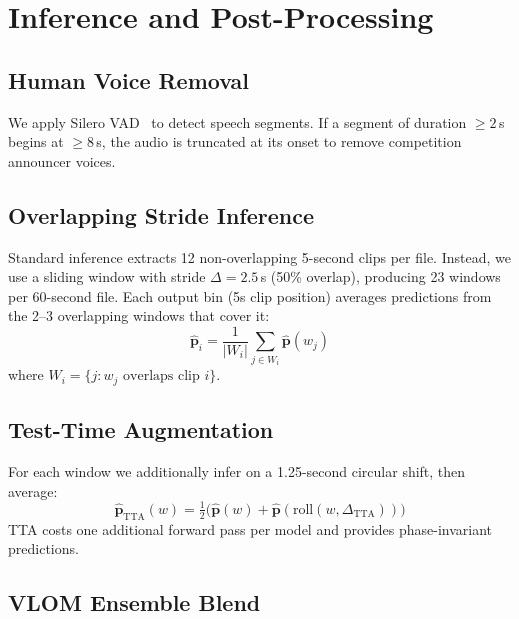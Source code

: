 \documentclass[10pt,twocolumn]{article}
\begin{document}
\section{Inference and Post-Processing}
\label{sec:inference}

\subsection{Human Voice Removal}
\label{sec:vad}

We apply Silero VAD~\cite{silero2021} to detect speech segments.
If a segment of duration $\geq 2$\,s begins at $\geq 8$\,s, the audio
is truncated at its onset to remove competition announcer voices.

\subsection{Overlapping Stride Inference}
\label{sec:stride}

Standard inference extracts 12 non-overlapping 5-second clips per file.
Instead, we use a sliding window with stride $\Delta = 2.5$\,s (50\% overlap),
producing 23 windows per 60-second file.
Each output bin (5s clip position) averages predictions from the 2--3
overlapping windows that cover it:
\begin{equation}
  \hat{\bm{p}}_i = \frac{1}{|W_i|}\sum_{j \in W_i} \hat{\bm{p}}(w_j)
  \label{eq:stride}
\end{equation}
where $W_i = \{j : w_j \text{ overlaps clip } i\}$.

\subsection{Test-Time Augmentation}
\label{sec:tta}

For each window we additionally infer on a 1.25-second circular shift,
then average:
\begin{equation}
  \hat{\bm{p}}_\text{TTA}(w) = \tfrac{1}{2}\bigl(\hat{\bm{p}}(w) + \hat{\bm{p}}(\text{roll}(w, \Delta_\text{TTA}))\bigr)
  \label{eq:tta}
\end{equation}
TTA costs one additional forward pass per model and provides
phase-invariant predictions.

\subsection{VLOM Ensemble Blend}
\label{sec:vlom}
\end{document}
